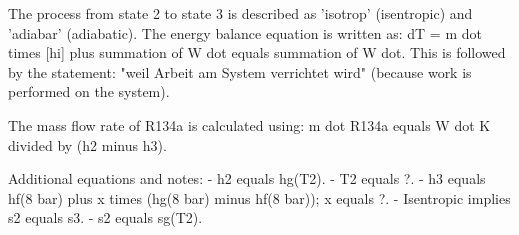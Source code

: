 The process from state 2 to state 3 is described as 'isotrop' (isentropic) and 'adiabar' (adiabatic).  
The energy balance equation is written as:  
dT = m dot times [hi] plus summation of W dot equals summation of W dot.  
This is followed by the statement: "weil Arbeit am System verrichtet wird" (because work is performed on the system).  

The mass flow rate of R134a is calculated using:  
m dot R134a equals W dot K divided by (h2 minus h3).  

Additional equations and notes:  
- h2 equals hg(T2).  
- T2 equals ?.  
- h3 equals hf(8 bar) plus x times (hg(8 bar) minus hf(8 bar)); x equals ?.  
- Isentropic implies s2 equals s3.  
- s2 equals sg(T2).